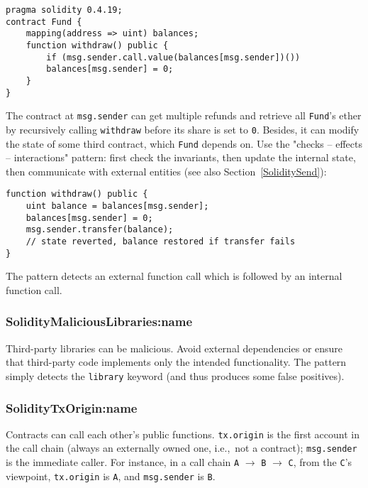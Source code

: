 \begin{lstlisting}[language=Solidity]
pragma solidity 0.4.19;
contract Fund {
	mapping(address => uint) balances;
	function withdraw() public {
		if (msg.sender.call.value(balances[msg.sender])())
		balances[msg.sender] = 0;
	}
}
\end{lstlisting}

The contract at \texttt{msg.sender} can get multiple refunds and retrieve all \texttt{Fund}'s ether by recursively calling \texttt{withdraw} before its share is set to \texttt{0}.
Besides, it can modify the state of some third contract, which \texttt{Fund} depends on.
Use the "checks -- effects -- interactions" pattern: first check the invariants, then update the internal state, then communicate with external entities (see also Section~\ref{SoliditySend}):
\begin{lstlisting}[language=Solidity]
function withdraw() public {
	uint balance = balances[msg.sender];	
	balances[msg.sender] = 0;
	msg.sender.transfer(balance);
	// state reverted, balance restored if transfer fails
}
\end{lstlisting}

The pattern detects an external function call which is followed by an internal function call.

\subsubsection{\let\letcs\texapiletcs \usevalue SolidityMaliciousLibraries:name \let\letcs\etoolboxletcs} \label{SolidityMaliciousLibraries}

Third-party libraries can be malicious.
Avoid external dependencies or ensure that third-party code implements only the intended functionality.
The pattern simply detects the \texttt{library} keyword (and thus produces some false positives).

\subsubsection{\let\letcs\texapiletcs \usevalue SolidityTxOrigin:name \let\letcs\etoolboxletcs} \label{SolidityTxOrigin}

Contracts can call each other's public functions.
\texttt{tx.origin} is the first account in the call chain (always an externally owned one, i.e.,~not a contract); \texttt{msg.sender} is the immediate caller.
For instance, in a call chain \texttt{A} $\rightarrow$ \texttt{B} $\rightarrow$ \texttt{C}, from the \texttt{C}'s viewpoint, \texttt{tx.origin} is \texttt{A}, and \texttt{msg.sender} is \texttt{B}.

